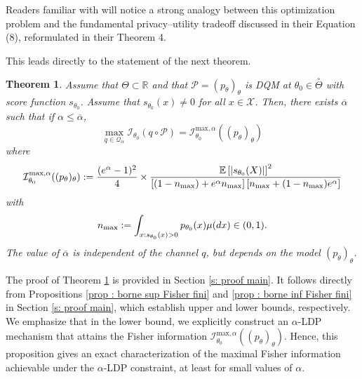 \documentclass[a4paper, 11pt]{article}
\newtheorem{thm}{Theorem}
\theoremstyle{definition}
\newcommand{\E}{{\mathbb{E}}}
\newcommand{\R}{{\mathbb{R}}}
\newcommand{\cI}{{\mathcal{I}}}
\newcommand{\cP}{{\mathcal{P}}}
\newcommand{\cQ}{{\mathcal{Q}}}
\newcommand{\cX}{{\mathcal{X}}}
\DeclarePairedDelimiter{\abs}{\lvert}{\rvert}
\begin{document}
{Readers familiar with \cite{kairouzExtremalMechanismsLocal2015} will notice a strong analogy between this optimization problem and the fundamental privacy–utility tradeoff discussed in their Equation (8), reformulated in their Theorem 4.

This leads directly to the statement of the next theorem. 

\begin{thm}\label{th : info cas fini}
	Assume that $\Theta \subset \R$ and that $\cP=(p_{\theta})_\theta$ 
	is DQM at $\theta_0 \in \overset{\circ}{\Theta}$ with score function $s_{\theta_0}$.
	 Assume that $s_{\theta_0}(x)\neq 0$ for all $x\in \cX$.
	Then, there exists $\overline{\alpha}$ such that if $\alpha \le \overline{\alpha}$,
	\begin{equation*}
		\max_{q \in \cQ_\alpha}  \cI_{\theta_0}(q \circ \cP) = 	\cI^{\text{max},\alpha}_{\theta_0}((p_\theta)_\theta)		
	\end{equation*}
		where
	\begin{equation}\label{eq : def I max caf fini}
		\cI^{\text{max},\alpha}_{\theta_0}((p_\theta)_\theta)
		:=\frac{(e^\alpha-1)^2}{4}%
		\times \frac{\E\left[\abs{s_{\theta_0}(X)}\right]^2}{\left[ (1-n_\text{max})+e^\alpha n_\text{max}  \right]
			\left[n_\text{max}+(1-n_\text{max})e^\alpha   \right]}
	\end{equation}
	with 
    \begin{equation}{\label{eq: def nmax}}
   n_\text{max}:= \int_{x: s_{\theta_0}(x)>0} p_{\theta_0}(x) \mu(dx)
	 \in (0,1).  
    \end{equation}
     The value of $\overline{\alpha}$ is independent of the channel $q$, but depends on the model $(p_{\theta})_\theta$.
\end{thm}

The proof of Theorem \ref{th : info cas fini} is provided in Section \ref{s: proof main}. It follows directly from Propositions \ref{prop : borne sup Fisher fini} and \ref{prop : borne inf Fisher fini} in Section \ref{s: proof main}, which establish upper and lower bounds, respectively. We emphasize that in the lower bound, we explicitly construct an $\alpha$-LDP mechanism that attains the Fisher information $\cI^{\text{max},\alpha}_{\theta_0}((p_\theta)_\theta)$. Hence, this proposition gives an exact characterization of the maximal Fisher information achievable under the $\alpha$-LDP constraint, at least for small values of $\alpha$.

}
\end{document}
